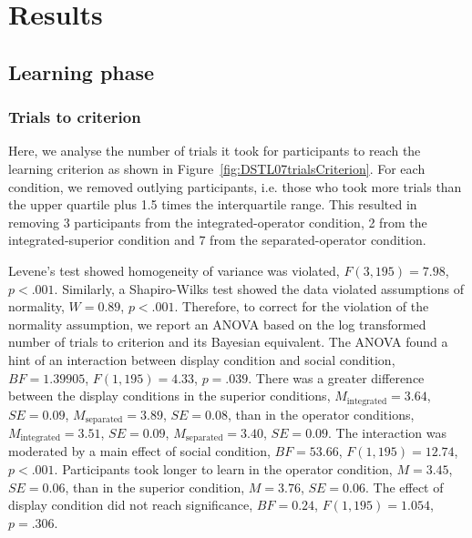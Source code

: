 \documentclass[doc, a4paper, apacite]{apa6}
\begin{document}
\section{Results}

\subsection{Learning phase}
\subsubsection{Trials to criterion}
Here, we analyse the number of trials it took for participants to reach the learning criterion as shown in Figure~\ref{fig:DSTL07trialsCriterion}. 
For each condition, we removed outlying participants, i.e. those who took more trials than the upper quartile plus 1.5 times the interquartile range. 
This resulted in removing 3 participants from the integrated-operator condition, 2 from the integrated-superior condition and 7 from the separated-operator condition. 

Levene's test showed homogeneity of variance was violated, $F(3,195)=7.98$, $p<.001$.
Similarly, a Shapiro-Wilks test showed the data violated assumptions of normality, $W=0.89$, $p<.001$. 
Therefore, to correct for the violation of the normality assumption, we report an ANOVA based on the log transformed number of trials to criterion and its Bayesian equivalent. 
The ANOVA found a hint of an interaction between display condition and social condition, $BF=1.39905$, $F(1, 195)=4.33$, $p=.039$. 
There was a greater difference between the display conditions in the superior conditions, $M_\text{integrated}=3.64$, $SE=0.09$, $M_\text{separated}=3.89$, $SE=0.08$, than in the operator conditions, $M_\text{integrated}=3.51$, $SE=0.09$, $M_\text{separated}=3.40$, $SE=0.09$. 
The interaction was moderated by a main effect of social condition, $BF=53.66$, $F(1, 195)=12.74$, $p<.001$. 
Participants took longer to learn in the operator condition, $M=3.45$, $SE=0.06$, than in the superior condition, $M=3.76$, $SE=0.06$. 
The effect of display condition did not reach significance, $BF=0.24$, $F(1, 195)=1.054$, $p=.306$. 
\end{document}
